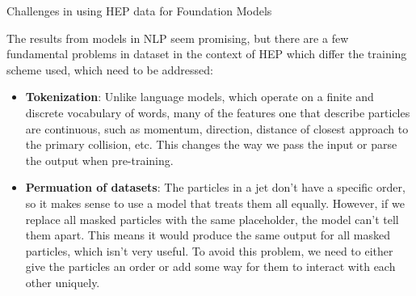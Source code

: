 \documentclass[10pt]{beamer}
\begin{document}
\begin{frame}{Challenges in using HEP data for Foundation Models}

    The results from models in NLP seem promising, but there are a few
    fundamental problems in dataset in the context of HEP which differ
    the training scheme used, which need to be addressed:

    \begin{itemize}[<+->]
        \item \textbf{Tokenization}:
            Unlike language models, which operate on a finite and
            discrete vocabulary of words, many of the features one
            that describe particles are continuous, such as momentum,
            direction, distance of closest approach to the primary collision, etc.
            This changes the way we pass the input or parse the output when
            pre-training.
        \item \textbf{Permuation of datasets}:
            The particles in a jet don't have a specific order, so it makes
            sense to use a model that treats them all equally. However, if we
            replace all masked particles with the same placeholder, the model
            can't tell them apart. This means it would produce the same output
            for all masked particles, which isn't very useful. To avoid this
            problem, we need to either give the particles an order or add some
            way for them to interact with each other uniquely.
    \end{itemize}

\end{frame}
\end{document}
